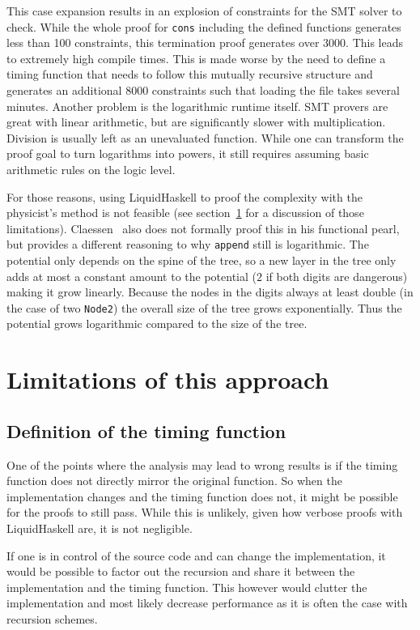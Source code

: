 \documentclass[sigplan,screen]{acmart}
\begin{document}
This case expansion results in an explosion of constraints for the SMT solver to check. While the whole proof for \texttt{cons} including the defined functions generates less than 100 constraints, this termination proof generates over 3000. This leads to extremely high compile times. This is made worse by the need to define a timing function that needs to follow this mutually recursive structure and generates an additional 8000 constraints such that loading the file takes several minutes. Another problem is the logarithmic runtime itself. SMT provers are great with linear arithmetic, but are significantly slower with multiplication. Division is usually left as an unevaluated function. While one can transform the proof goal to turn logarithms into powers, it still requires assuming basic arithmetic rules on the logic level.

For those reasons, using LiquidHaskell to proof the complexity with the physicist's method is not feasible (see section~\ref{sec:limitations} for a discussion of those limitations). Claessen~\cite{fingertrees_new} also does not formally proof this in his functional pearl, but provides a different reasoning to why \texttt{append} still is logarithmic. The potential only depends on the spine of the tree, so a new layer in the tree only adds at most a constant amount to the potential ($2$ if both digits are dangerous) making it grow linearly. Because the nodes in the digits always at least double (in the case of two \texttt{Node2}) the overall size of the tree grows exponentially. Thus the potential grows logarithmic compared to the size of the tree.

\section{Limitations of this approach}\label{sec:limitations}

\subsection{Definition of the timing function}

One of the points where the analysis may lead to wrong results is if the timing function does not directly mirror the original function. So when the implementation changes and the timing function does not, it might be possible for the proofs to still pass. While this is unlikely, given how verbose proofs with LiquidHaskell are, it is not negligible.

If one is in control of the source code and can change the implementation, it would be possible to factor out the recursion and share it between the implementation and the timing function. This however would clutter the implementation and most likely decrease performance as it is often the case with recursion schemes.
\end{document}
